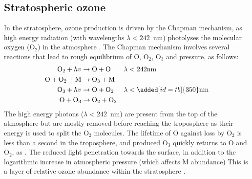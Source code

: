  \subsection{Stratospheric ozone}
  
    In the stratosphere, ozone production is driven by the Chapman mechanism, as high energy radiation (with wavelengths $\lambda<242$~nm) photolyses the molecular oxygen (O$_2$) in the atmosphere \parencite[][Chapter 3, section 2]{BrasseurJacob2017}.
    The Chapman mechanism involves several reactions that lead to rough equilibrium of O, O$_2$, O$_3$ and pressure, as follows:
    \begin{equation}
      \begin{aligned}
        \text{O}_2 + hv              & \to \text{O}+\text{O}     && \lambda < 242 \text{nm} \\
        \text{O}+\text{O}_2+\text{M} & \to \text{O}_3+\text{M}   &&    \\
        \text{O}_3 + hv              & \to \text{O}+\text{O}_2   && \lambda < \added[id=tb]{350} \text{nm} \\
        \text{O} + \text{O}_3        & \to \text{O}_2+\text{O}_2 &&       \\
      \end{aligned}
      \label{LR:O3:eqn_Chapman}
    \end{equation}
    The high energy photons ($\lambda < 242$~nm) are present from the top of the atmosphere but are mostly removed before reaching the troposphere as their energy is used to split the O$_2$ molecules.
    The lifetime of O against loss by O$_2$ is less than a second in the troposphere, and produced O$_3$ quickly returns to O and O$_2$, as .
    The reduced light penetration towards the surface, in addition to the logarithmic increase in atmospheric pressure (which affects M abundance) 
    This is a layer of relative ozone abundance within the stratosphere .
  
